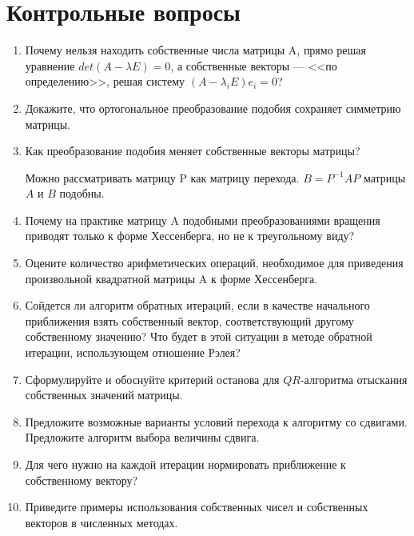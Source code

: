 \documentclass[12pt, a4paper]{article}
\begin{document}
\section{Контрольные вопросы}
\begin{enumerate}
\item Почему нельзя находить собственные числа матрицы A, прямо решая уравнение $det(A - \lambda E) = 0$, а собственные векторы --- <<по определению>>, решая систему $(A - \lambda_i E)e_i = 0$?

\item Докажите, что ортогональное преобразование подобия сохраняет симметрию матрицы.

\item Как преобразование подобия меняет собственные векторы
матрицы?

Можно рассматривать матрицу P как матрицу перехода. $B = P^{-1}AP$ матрицы $A$ и $B$ подобны. 


\item Почему на практике матрицу A подобными преобразованиями вращения приводят только к форме Хессенберга, но не к треугольному виду?

\item Оцените количество арифметических операций, необходимое для приведения произвольной квадратной матрицы A к форме Хессенберга.

\item Сойдется ли алгоритм обратных итераций, если в качестве начального приближения взять собственный вектор, соответствующий другому собственному значению? Что будет в этой ситуации в методе обратной итерации, использующем отношение Рэлея?

\item Сформулируйте и обоснуйте критерий останова для $QR$-алгоритма отыскания собственных значений матрицы.

\item Предложите возможные варианты условий перехода к алгоритму со сдвигами. Предложите алгоритм выбора величины сдвига.

\item Для чего нужно на каждой итерации нормировать приближение к собственному вектору?

\item Приведите примеры использования собственных чисел и собственных векторов в численных методах.
\end{enumerate}
\end{document}
